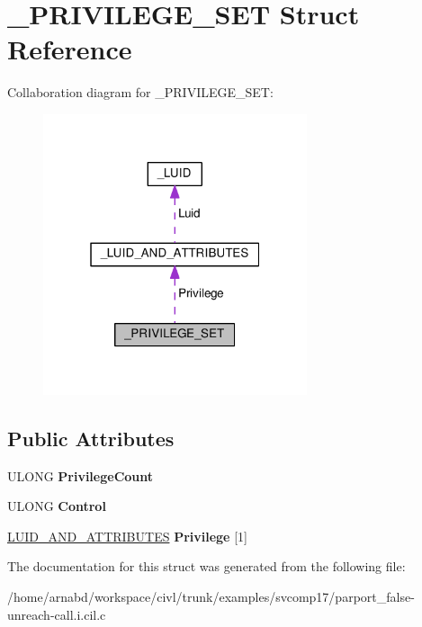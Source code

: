 \hypertarget{struct__PRIVILEGE__SET}{}\section{\+\_\+\+P\+R\+I\+V\+I\+L\+E\+G\+E\+\_\+\+S\+E\+T Struct Reference}
\label{struct__PRIVILEGE__SET}


Collaboration diagram for \+\_\+\+P\+R\+I\+V\+I\+L\+E\+G\+E\+\_\+\+S\+E\+T\+:
\nopagebreak
\begin{figure}[H]
\begin{center}
\leavevmode
\includegraphics[width=220pt]{struct__PRIVILEGE__SET__coll__graph}
\end{center}
\end{figure}
\subsection*{Public Attributes}
\begin{DoxyCompactItemize}
\item 
\hypertarget{struct__PRIVILEGE__SET_acf053936624411d4a0b7370693299e9e}{}U\+L\+O\+N\+G {\bfseries Privilege\+Count}\label{struct__PRIVILEGE__SET_acf053936624411d4a0b7370693299e9e}

\item 
\hypertarget{struct__PRIVILEGE__SET_a3df45b81acf2a35fe9ed114238adc49b}{}U\+L\+O\+N\+G {\bfseries Control}\label{struct__PRIVILEGE__SET_a3df45b81acf2a35fe9ed114238adc49b}

\item 
\hypertarget{struct__PRIVILEGE__SET_a3501ce79a7339ca2cf674a0af6f2e3b0}{}\hyperlink{struct__LUID__AND__ATTRIBUTES}{L\+U\+I\+D\+\_\+\+A\+N\+D\+\_\+\+A\+T\+T\+R\+I\+B\+U\+T\+E\+S} {\bfseries Privilege} \mbox{[}1\mbox{]}\label{struct__PRIVILEGE__SET_a3501ce79a7339ca2cf674a0af6f2e3b0}

\end{DoxyCompactItemize}


The documentation for this struct was generated from the following file\+:\begin{DoxyCompactItemize}
\item 
/home/arnabd/workspace/civl/trunk/examples/svcomp17/parport\+\_\+false-\/unreach-\/call.\+i.\+cil.\+c\end{DoxyCompactItemize}
